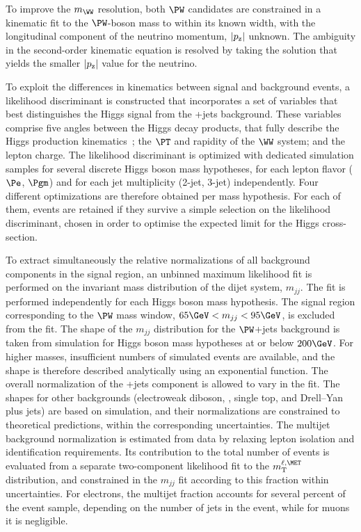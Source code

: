 To improve the $m_{\WW}$ resolution, both $\PW$ candidates are constrained in a kinematic fit to the $\PW$-boson
mass to within its known width, with the longitudinal component of the neutrino momentum, $|p_{\textnormal{z}}|$ unknown. The ambiguity in the second-order kinematic equation is resolved by taking the solution that yields the smaller $|p_{\textnormal{z}}|$ value for the neutrino.  


To exploit the differences in kinematics between signal and background events, a likelihood discriminant is constructed
that incorporates a set of variables that best distinguishes the Higgs signal from the \PW+jets background. 
These variables comprise five angles between the Higgs decay products, that fully describe the Higgs production kinematics~\cite{Gao:2010qx}; the $\PT$ and rapidity of the $\WW$ system; and the lepton charge.
The likelihood discriminant is optimized with dedicated simulation samples for several discrete Higgs boson mass hypotheses,
for each lepton flavor ($\Pe$, $\Pgm$) and for each jet multiplicity (2-jet, 3-jet) independently. Four different optimizations are therefore obtained per mass hypothesis. For each of them, events are retained if they
survive a simple selection on the likelihood discriminant, chosen in order to optimise the expected limit for the Higgs cross-section.


To extract simultaneously the relative normalizations of all background components in the signal region, an
unbinned maximum likelihood fit is performed on the invariant mass distribution of the dijet system, $m_{jj}$.
The fit is performed independently for each Higgs boson mass hypothesis. The signal region corresponding to the $\PW$
mass window, $65\GeV < m_{jj} < 95\GeV$, is excluded from the fit. The shape of the $m_{jj}$ distribution for the
$\PW$+jets background is taken from simulation for Higgs boson mass hypotheses at or below $200\GeV$. For higher masses,
insufficient numbers of simulated events are available, and the shape is therefore described analytically using an exponential function. The overall normalization of the \PW+jets component is allowed to vary in the fit. The shapes for
other backgrounds (electroweak diboson, \ttbar, single top, and Drell--Yan plus jets) are based on simulation, and their
normalizations are constrained to theoretical predictions, within the corresponding uncertainties.
The multijet background normalization is estimated from data by relaxing lepton isolation and identification requirements.
Its contribution to the total number of events is evaluated from a separate two-component likelihood fit to the $m_{\rm{T}}^{\ell,\MET}$ distribution, and constrained in the $m_{jj}$ fit according to this fraction within
uncertainties. For electrons, the multijet fraction accounts for several percent of the event sample, depending on the
number of jets in the event, while for muons it is negligible.


